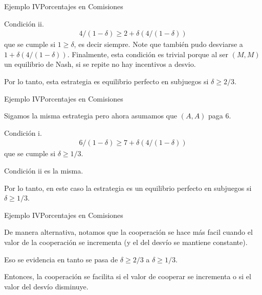 \documentclass[notes, 11pt]{beamer} %
\newenvironment{wideitemize}{\itemize\addtolength{\itemsep}{10pt}}{\enditemize}
\begin{document}
\begin{frame}{Ejemplo IV}{Porcentajes en Comisiones}
\begin{wideitemize}
	\item<1-> Condici\'on ii.
		\begin{align*}
			4/(1-\delta) \geq 2 + \delta(4/(1-\delta))
		\end{align*} que se cumple si $1\geq\delta$, es decir siempre. Note que tambi\'en pudo desviarse a $1 + \delta(4/(1-\delta))$. Finalmente, esta condici\'on es trivial porque al ser $(M,M)$ un equilibrio de Nash, si se repite no hay incentivos a desvio. 
	\item<2-> Por lo tanto, esta estrategia es equilibrio perfecto en subjuegos si $\delta \geq 2/3$.
\end{wideitemize}
\end{frame}

\begin{frame}{Ejemplo IV}{Porcentajes en Comisiones}
\begin{wideitemize}
	\item<1-> Sigamos la misma estrategia pero ahora asumamos que $(A,A)$ paga 6.
	\item<2-> Condici\'on i.
		\begin{align*}
			6/(1-\delta) \geq 7 + \delta(4/(1-\delta))
		\end{align*} que se cumple si $\delta \geq 1/3$.
	\item<3-> Condici\'on ii es la misma.
	\item<4-> Por lo tanto, en este caso la estrategia es un equilibrio perfecto en subjuegos si $\delta \geq 1/3$.
\end{wideitemize}
\end{frame}

\begin{frame}{Ejemplo IV}{Porcentajes en Comisiones}
\begin{wideitemize}
	\item<1-> De manera alternativa, notamos que la cooperaci\'on se hace m\'as facil cuando el valor de la cooperaci\'on se incrementa (y el del desv\'io se mantiene constante).
	\item<2-> Eso se evidencia en tanto se pasa de $\delta \geq 2/3$ a $\delta \geq 1/3$.
	\item<3-> Entonces, la cooperaci\'on se facilita si el valor de cooperar se incrementa o si el valor del desv\'io disminuye.
\end{wideitemize}
\end{frame}
\end{document}
